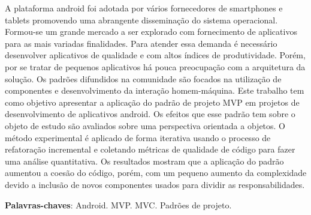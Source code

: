 \documentclass[
	12pt,				%
	openright,			%
	twoside,			%
	a4paper,			%
	english,			%
	french,				%
	spanish,			%
	brazil,				%
	]{abntex2}
\begin{document}
\frenchspacing 

\pretextual

\imprimircapa

\imprimirfolhaderosto*

\begin{resumo}
A plataforma android foi adotada por vários fornecedores de smartphones e
tablets promovendo uma abrangente disseminação do sistema operacional.
Formou-se um grande mercado a ser explorado com fornecimento de aplicativos para
as mais variadas finalidades. Para atender essa demanda é necessário
desenvolver aplicativos de qualidade e com altos índices de produtividade. Porém, por
se tratar de pequenos  aplicativos há pouca preocupação com a arquitetura da solução. 
Os padrões difundidos na comunidade são focados na utilização de componentes e
desenvolvimento da interação homem-máquina. Este trabalho tem como objetivo
apresentar a aplicação do padrão de projeto MVP em projetos de desenvolvimento de aplicativos
android. Os efeitos que esse padrão tem sobre o objeto de estudo são
avaliados sobre uma perspectiva orientada a objetos. O método experimental é
aplicado de forma iterativa usando o processo de refatoração incremental e
coletando métricas de qualidade de código para fazer uma análise quantitativa.
Os resultados mostram que a aplicação do padrão aumentou a coesão do código,
porém, com um pequeno aumento da complexidade devido a inclusão de novos
componentes usados para dividir as responsabilidades.

\vspace{\onelineskip}
    
\noindent
\textbf{Palavras-chaves}: Android. MVP. MVC. Padrões de projeto.
\end{resumo}
\end{document}
